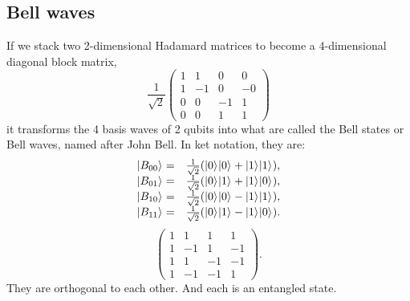 \documentclass[oneside, letter, 12pt]{book}
\begin{document}
\subsection{Bell waves}
If we stack two 2-dimensional Hadamard matrices to become a 4-dimensional diagonal block matrix,
\begin{equation}
\frac 1 {\sqrt{2}}
  \begin{pmatrix}
    1 & 1 & 0 & 0 \\
    1 & -1 & 0 & -0 \\
    0 & 0 & -1 & 1 \\
    0 & 0 & 1 & 1
    \end{pmatrix}
\end{equation}
it transforms the 4 basis waves of 2 qubits into what are called the Bell states or Bell waves, named after John Bell. In ket notation, they are:
\begin{equation}
\begin{array}{rl}
    \vert {B_{00}} \rangle_{} =& \frac 1 {\sqrt 2} (\vert {0} \rangle_{}\vert {0} \rangle_{}+\vert {1} \rangle_{}\vert {1} \rangle_{}),\\
    \vert {B_{01}} \rangle_{} =& \frac 1 {\sqrt 2} (\vert {0} \rangle_{}\vert {1} \rangle_{}+\vert {1} \rangle_{}\vert {0} \rangle_{}),\\
    \vert {B_{10}} \rangle_{} =& \frac 1 {\sqrt 2} (\vert {0} \rangle_{}\vert {0} \rangle_{}-\vert {1} \rangle_{}\vert {1} \rangle_{}),\\
    \vert {B_{11}} \rangle_{} =& \frac 1 {\sqrt 2} (\vert {0} \rangle_{}\vert {1} \rangle_{}-\vert {1} \rangle_{}\vert {0} \rangle_{}).
\end{array}
\end{equation}
\begin{equation}
\begin{pmatrix} %
    1 & 1 & 1 & 1 \\
    1 & -1 & 1 & -1 \\
    1 & 1 & -1 & -1 \\
    1 & -1 & -1 & 1
    \end{pmatrix}.
\end{equation}
They are orthogonal to each other. And each is an entangled state.
\end{document}
